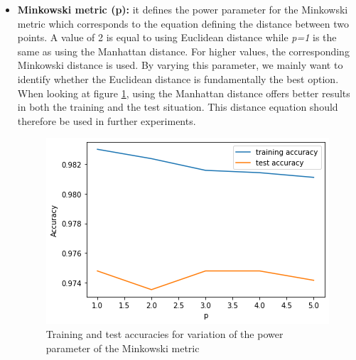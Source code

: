\begin{itemize}
\begin{itemize}
        \item \textbf{Minkowski metric (p):} it defines the power parameter for the Minkowski metric which corresponds to the equation defining the distance between two points. A value of 2 is equal to using Euclidean distance while \textit{p=1} is the same as using the Manhattan distance. For higher values, the corresponding Minkowski distance is used. By varying this parameter, we mainly want to identify whether the Euclidean distance is fundamentally the best option. When looking at figure \ref{fig:minkowski}, using the Manhattan distance offers better results in both the training and the test situation. This distance equation should therefore be used in further experiments.
        \begin{figure}[!ht]
        \centering
          \includegraphics[width=0.80\linewidth]{Figures/minkowski.png}
          \captionsetup{justification=centering}
          \caption{Training and test accuracies for variation of the power parameter of the Minkowski metric}
          \label{fig:minkowski}
        \end{figure}
        

\end{itemize}
\end{itemize}
